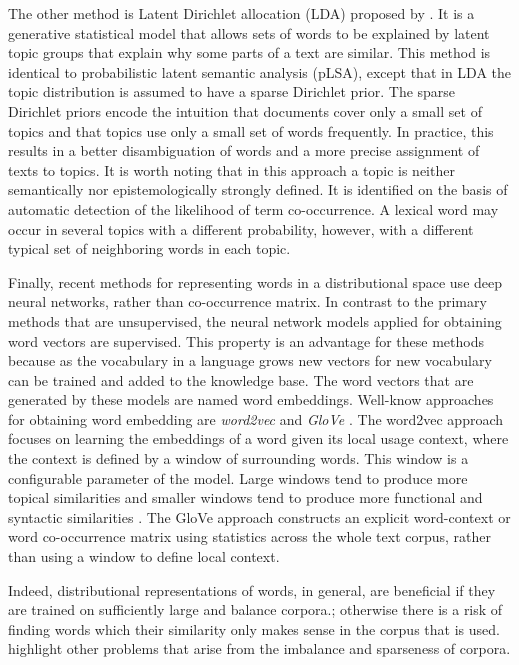 The other method is Latent Dirichlet allocation (LDA) proposed by . 
It is a generative statistical model that allows sets of words to be explained by latent topic groups that explain why some parts of a text are similar. 
This method is identical to probabilistic latent semantic analysis (pLSA), except that in LDA the topic distribution is assumed to have a sparse Dirichlet prior.
The sparse Dirichlet priors encode the intuition that documents cover only a small set of topics and that topics use only a small set of words frequently. 
In practice, this results in a better disambiguation of words and a more precise assignment of texts to topics.
It is worth noting that in this approach a topic is neither semantically nor epistemologically strongly defined. 
It is identified on the basis of automatic detection of the likelihood of term co-occurrence. 
A lexical word may occur in several topics with a different probability, however, with a different typical set of neighboring words in each topic.

Finally, recent methods for representing words in a distributional space use deep neural networks, rather than co-occurrence matrix. 
In contrast to the primary methods that are unsupervised, the neural network models applied for obtaining word vectors are supervised.  
This property is an advantage for these methods because as the vocabulary in a language grows new vectors for new vocabulary can be trained and added to the knowledge base. 
The word vectors that are generated by these models are named word embeddings. 
Well-know approaches for obtaining word embedding are \emph{word2vec}  \cite{mikolov13} and \emph{GloVe} \cite{pennington14}. 
The word2vec approach focuses on learning the embeddings of a word given its local usage context, where the context is defined by a window of surrounding words. 
This window is a configurable parameter of the model. 
Large windows tend to produce more topical similarities and smaller windows tend to produce more functional and syntactic similarities \cite{goldberg17}. 
The GloVe approach constructs an explicit word-context or word co-occurrence matrix using statistics across the whole text corpus, rather than using a window to define local context. 

Indeed, distributional representations of words, in general, are beneficial if they are trained on sufficiently large and balance corpora.; otherwise there is a risk \cite{lindekang98b} of finding words which their similarity only makes sense in the corpus that is used. 
 highlight other problems that arise from the imbalance and sparseness of corpora.

